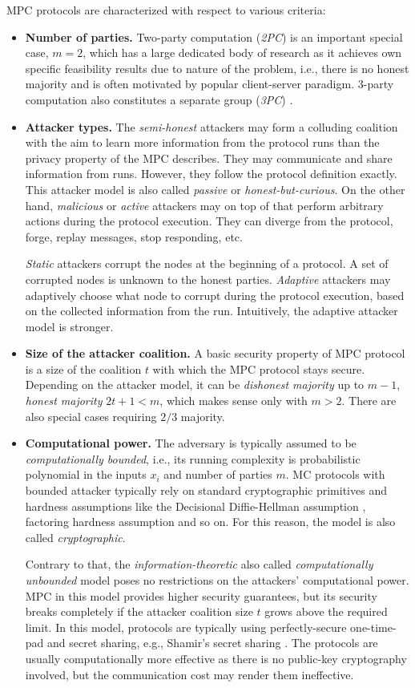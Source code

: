\documentclass[
  digital, %
  twoside, %
  table,   %
  lof,     %
  lot,     %
]{fithesis3}
\newcommand{\itembf}[1]{\item {\bf{#1}}}
\theoremstyle{definition}
\theoremstyle{remark}
\begin{document}
MPC protocols are characterized with respect to various criteria:
\begin{itemize}
    \itembf{Number of parties.} Two-party computation (\emph{2PC}) is an important special case, $m=2$, which has a large dedicated body of research as it achieves own specific feasibility results due to nature of the problem, i.e., there is no honest majority and is often motivated by popular client-server paradigm. 3-party computation also constitutes a separate group (\emph{3PC}) \cite{CKMZ14, MRZ15}.

    \itembf{Attacker types.} The \emph{semi-honest} attackers may form a colluding coalition with the aim to learn more information from the protocol runs than the privacy property of the MPC describes. They may communicate and share information from runs. However, they follow the protocol definition exactly. This attacker model is also called \emph{passive} or \emph{honest-but-curious}. 
    On the other hand, \emph{malicious} or \emph{active} attackers may on top of that perform arbitrary actions during the protocol execution. They can diverge from the protocol, forge, replay messages, stop responding, etc.

    \emph{Static} attackers corrupt the nodes at the beginning of a protocol. A set of corrupted nodes is unknown to the honest parties. \emph{Adaptive} attackers may adaptively choose what node to corrupt during the protocol execution, based on the collected information from the run. Intuitively, the adaptive attacker model is stronger.
    
    \itembf{Size of the attacker coalition.} A basic security property of MPC protocol is a size of the coalition $t$ with which the MPC protocol stays secure. Depending on the attacker model, it can be \emph{dishonest majority} up to $m-1$, \emph{honest majority} $2t+1 < m$, which makes sense only with $m>2$. There are also special cases requiring $2/3$ majority.

    \itembf{Computational power.} The adversary is typically assumed to be \emph{computationally bounded}, i.e., its running complexity is probabilistic polynomial in the inputs $x_i$ and number of parties $m$.
    MC protocols with bounded attacker typically rely on standard cryptographic primitives and hardness assumptions like the Decisional Diffie-Hellman assumption \cite{KL07}, factoring hardness assumption and so on. For this reason, the model is also called \emph{cryptographic}.
    
    Contrary to that, the \emph{information-theoretic} also called \emph{computationally unbounded} model poses no restrictions on the attackers' computational power. MPC in this model provides higher security guarantees, but its security breaks completely if the attacker coalition size $t$ grows above the required limit. 
    In this model, protocols are typically using perfectly-secure one-time-pad and secret sharing, e.g., Shamir's secret sharing \cite{Shamir79}. The protocols are usually computationally more effective as there is no public-key cryptography involved, but the communication cost may render them ineffective. 
    

\end{itemize}
\end{document}
